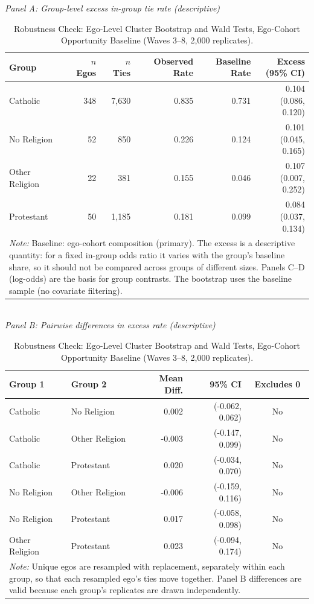 \begin{table}[htbp]
\caption{\label{tab:bootstrap-sensitivity}Robustness Check: Ego-Level Cluster Bootstrap and Wald Tests, Ego-Cohort Opportunity Baseline (Waves 3--8, 2,000 replicates).}
\centering
\scriptsize
\textit{Panel A: Group-level excess in-group tie rate (descriptive)}\\[2pt]
\begin{tabular}{lrrrrr}
\toprule
Group & $n$ Egos & $n$ Ties & Observed Rate & Baseline Rate & Excess (95\% CI) \\
\midrule
Catholic & 348 & 7,630 & 0.835 & 0.731 & 0.104 (0.086, 0.120) \\
No Religion & 52 & 850 & 0.226 & 0.124 & 0.101 (0.045, 0.165) \\
Other Religion & 22 & 381 & 0.155 & 0.046 & 0.107 (0.007, 0.252) \\
Protestant & 50 & 1,185 & 0.181 & 0.099 & 0.084 (0.037, 0.134) \\
\bottomrule
\multicolumn{6}{p{0.95\textwidth}}{\footnotesize \textit{Note:} Baseline: ego-cohort composition (primary). The excess is a descriptive quantity: for a fixed in-group odds ratio it varies with the group's baseline share, so it should not be compared across groups of different sizes. Panels C--D (log-odds) are the basis for group contrasts. The bootstrap uses the baseline sample (no covariate filtering).} \\
\end{tabular}
\\[8pt]
\textit{Panel B: Pairwise differences in excess rate (descriptive)}\\[2pt]
\begin{tabular}{llrrc}
\toprule
Group 1 & Group 2 & Mean Diff. & 95\% CI & Excludes 0 \\
\midrule
Catholic & No Religion & 0.002 & (-0.062, 0.062) & No \\
Catholic & Other Religion & -0.003 & (-0.147, 0.099) & No \\
Catholic & Protestant & 0.020 & (-0.034, 0.070) & No \\
No Religion & Other Religion & -0.006 & (-0.159, 0.116) & No \\
No Religion & Protestant & 0.017 & (-0.058, 0.098) & No \\
Other Religion & Protestant & 0.023 & (-0.094, 0.174) & No \\
\bottomrule
\multicolumn{5}{p{0.95\textwidth}}{\footnotesize \textit{Note:} Unique egos are resampled with replacement, separately within each group, so that each resampled ego's ties move together. Panel B differences are valid because each group's replicates are drawn independently.} \\

\end{tabular}
\end{table}
